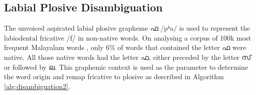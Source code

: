 
\subsection{Labial Plosive Disambiguation}
\label{labiodentalfricative}

The unvoiced aspirated labial plosive grapheme {\mal ഫ} {\ipa /pʰa/} is used to
represent the labiodental fricative {\ipa /f/} in non-native words. On
analysing a corpus of 100k most frequent Malayalam words
\cite{kunchukuttan2020ai4bharat}, only 6\% of words that contained the letter
	{\mal ഫ} were native. All those native words had the letter {\mal ഫ}, either
preceded by the letter {\mal സ്} or followed by {\mal ല}. This graphemic context
is used as the parameter to determine the word origin and remap fricative to
plosive as described in Algorithm \ref{alg:disambiguation2}.




